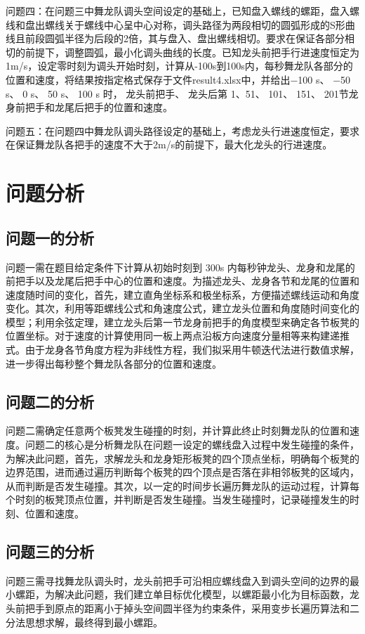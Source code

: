 \documentclass[withoutpreface,bwprint]{cumcmthesis} %
\begin{document}
	问题四：在问题三中舞龙队调头空间设定的基础上，已知盘入螺线的螺距，盘入螺线和盘出螺线关于螺线中心呈中心对称，调头路径为两段相切的圆弧形成的S形曲线且前段圆弧半径为后段的2倍，其与盘入、盘出螺线相切。要求在保证各部分相切的前提下，调整圆弧，最小化调头曲线的长度。已知龙头前把手行进速度恒定为1m/s，设定零时刻为调头开始时刻，计算从-100s到100s内，每秒舞龙队各部分的位置和速度，将结果按指定格式保存于文件result4.xlsx中，并给出−100 s、 −50 s、 0 s、 50 s、 100 s 时， 龙头前把手、 龙头后第 1、51、 101、 151、 201节龙身前把手和龙尾后把手的位置和速度。
	
	问题五：在问题四中舞龙队调头路径设定的基础上，考虑龙头行进速度恒定，要求在保证舞龙队各把手的速度不大于2m/s的前提下，最大化龙头的行进速度。
	
	\section{问题分析}
	\subsection{问题一的分析}
	问题一需在题目给定条件下计算从初始时刻到 300s 内每秒钟龙头、龙身和龙尾的前把手以及龙尾后把手中心的位置和速度。为描述龙头、龙身各节和龙尾的位置和速度随时间的变化，首先，建立直角坐标系和极坐标系，方便描述螺线运动和角度变化。其次，利用等距螺线公式和角速度公式，建立龙头位置和角度随时间变化的模型；利用余弦定理，建立龙头后第一节龙身前把手的角度模型来确定各节板凳的位置坐标。对于速度的计算使用同一板上两点沿板方向速度分量相等来构建递推式。由于龙身各节角度方程为非线性方程，我们拟采用牛顿迭代法进行数值求解，进一步得出每秒整个舞龙队各部分的位置和速度。
	\subsection{问题二的分析}
	问题二需确定任意两个板凳发生碰撞的时刻，并计算此终止时刻舞龙队的位置和速度。问题二的核心是分析舞龙队在问题一设定的螺线盘入过程中发生碰撞的条件，为解决此问题，首先，求解龙头和龙身矩形板凳的四个顶点坐标，明确每个板凳的边界范围，进而通过遍历判断每个板凳的四个顶点是否落在非相邻板凳的区域内，从而判断是否发生碰撞。其次，以一定的时间步长遍历舞龙队的运动过程，计算每个时刻的板凳顶点位置，并判断是否发生碰撞。当发生碰撞时，记录碰撞发生的时刻、位置和速度。
	\subsection{问题三的分析}
	问题三需寻找舞龙队调头时，龙头前把手可沿相应螺线盘入到调头空间的边界的最小螺距，为解决此问题，我们建立单目标优化模型，以螺距最小化为目标函数，龙头前把手到原点的距离小于掉头空间圆半径为约束条件，采用变步长遍历算法和二分法思想求解，最终得到最小螺距。
	
\end{document}
